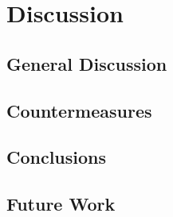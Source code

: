 \section{Discussion}
\subsection{General Discussion}

\subsection{Countermeasures}

\subsection{Conclusions}

\subsection{Future Work}